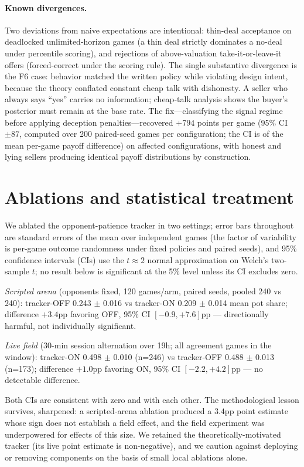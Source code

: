 \documentclass{article}
\begin{document}
\paragraph{Known divergences.} Two deviations from naive expectations are intentional: thin-deal acceptance on deadlocked unlimited-horizon games (a thin deal strictly dominates a no-deal under percentile scoring), and rejections of above-valuation take-it-or-leave-it offers (forced-correct under the scoring rule). The single substantive divergence is the F6 case: behavior matched the written policy while violating design intent, because the theory conflated constant cheap talk with dishonesty. A seller who always says ``yes'' carries no information; cheap-talk analysis shows the buyer's posterior must remain at the base rate. The fix---classifying the signal regime before applying deception penalties---recovered $+794$ points per game (95\% CI $\pm87$, computed over 200 paired-seed games per configuration; the CI is of the mean per-game payoff difference) on affected configurations, with honest and lying sellers producing identical payoff distributions by construction.

\section{Ablations and statistical treatment}
We ablated the opponent-patience tracker in two settings; error bars throughout are standard errors of the mean over independent games (the factor of variability is per-game outcome randomness under fixed policies and paired seeds), and 95\% confidence intervals (CIs) use the $t\approx2$ normal approximation on Welch's two-sample $t$; no result below is significant at the 5\% level unless its CI excludes zero.

\emph{Scripted arena} (opponents fixed, 120 games/arm, paired seeds, pooled 240 vs 240): tracker-OFF 0.243 $\pm$ 0.016 vs tracker-ON 0.209 $\pm$ 0.014 mean pot share; difference $+3.4$pp favoring OFF, 95\% CI $[-0.9, +7.6]$pp --- directionally harmful, not individually significant.

\emph{Live field} (30-min session alternation over 19h; all agreement games in the window): tracker-ON 0.498 $\pm$ 0.010 (n=246) vs tracker-OFF 0.488 $\pm$ 0.013 (n=173); difference $+1.0$pp favoring ON, 95\% CI $[-2.2, +4.2]$pp --- no detectable difference.

Both CIs are consistent with zero and with each other. The methodological lesson survives, sharpened: a scripted-arena ablation produced a $3.4$pp point estimate whose sign does not establish a field effect, and the field experiment was underpowered for effects of this size. We retained the theoretically-motivated tracker (its live point estimate is non-negative), and we caution against deploying or removing components on the basis of small local ablations alone.
\end{document}
